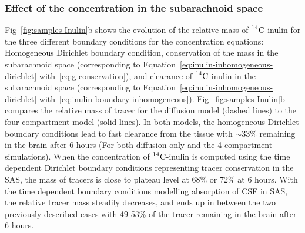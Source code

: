 \documentclass[10pt]{article}
\newcommand{\1}{^{(1)}}
\newcommand{\2}{^{(2)}}
\newcommand{\Cinulin}{$\prescript{14}{}{\text{C}}$-inulin }
\newcommand{\commentout}[1]{}
\begin{document}
\subsubsection{Effect of the concentration in the subarachnoid space}
Fig~\ref{fig:samples-Inulin}b shows the evolution of the relative mass of \Cinulin for the three different boundary conditions for the concentration equations: Homogeneous Dirichlet boundary condition, conservation of the mass in the subarachnoid space (corresponding to Equation~\eqref{eq:inulin-inhomogeneous-dirichlet} with~\eqref{eq:g-conservation}), and clearance of \Cinulin in the subarachnoid space (corresponding to Equation~\eqref{eq:inulin-inhomogeneous-dirichlet} with~\eqref{eq:inulin-boundary-inhomogeneous}). Fig~\ref{fig:samples-Inulin}b compares the relative mass of tracer for the diffusion model (dashed lines) to the four-compartment model (solid lines). In both models, the homogeneous Dirichlet boundary conditions lead to fast clearance from the tissue with $\sim33$\% remaining in the brain after 6 hours (For both diffusion only and the 4-compartment simulations). When the concentration of \Cinulin is computed using the time dependent Dirichlet boundary conditions representing tracer conservation in the SAS, the mass of tracers is close to plateau level at 68\% or 72\% at 6 hours. With the time dependent boundary conditions modelling absorption of CSF in SAS, the relative tracer mass steadily decreases, and ends up in between the two previously described cases with 49-53\%  of the tracer remaining in the brain after 6 hours. 
\commentout{
 \begin{figure}[htbp]
     \centering
     \begin{subfigure}[t]{0.45\textwidth}
         \captionsetup{width=0.9\textwidth}
         \centering
         \caption{Single diffusion equation}
         \label{fig:diffusion-bcs-Inulin}
     \end{subfigure}
     \hfill
     \begin{subfigure}[t]{0.45\textwidth}
         \captionsetup{width=0.9\textwidth}
         \centering
         \caption{Multi-compartment model.}
         \label{fig:multi-compartment-bcs-Inulin}
     \end{subfigure}
     \caption{Relative \Cinulin mass located in the totality of the brain for the different boundary conditions.}
     \label{fig:bcs-Inulin}
\end{figure}
\begin{figure}
    \centering
    \caption{Relative \Cinulin mass located in the totality of the brain for the different boundary conditions. Solid lines result from the multi-compartment model simulations while dashed lines result from diffusion only in the ECS.}
   \label{fig:bcs-Inulin}
\end{figure}
}
\end{document}
